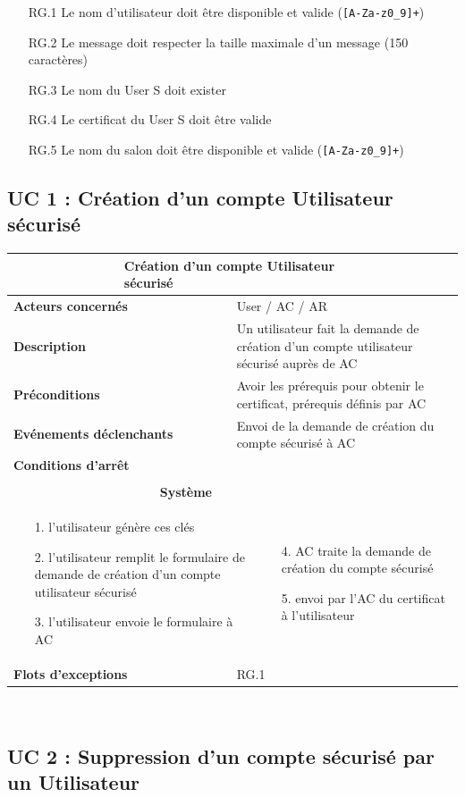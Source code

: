 \documentclass[a4paper,11pt,french]{article}
\newcommand{\fiche}[9] {
	\noindent
\begin{tabular}{|p{3.5cm}| p{1cm} | p{3cm} | p{.5cm} | p{7cm}|} 
\hline
\rowcolor{blue}
\multicolumn{2}{|l|}{\color{white}\bfseries{Nom}} & \multicolumn{3}{l|}{\color{white}\bfseries{#1}}\\
\hline
\multicolumn{2}{|l|}{\bfseries{Acteurs concernés}} & \multicolumn{3}{m{10.5cm}|}{#2}\\
\hline
\multicolumn{2}{|l|}{\bfseries{Description}} & \multicolumn{3}{m{10.5cm}|}{#3}\\
\hline
\multicolumn{2}{|l|}{\bfseries{Préconditions}} & \multicolumn{3}{m{10.5cm}|}{#4}\\
\hline
\multicolumn{2}{|l|}{\bfseries{Evénements déclenchants}} & \multicolumn{3}{m{10.5cm}|}{#5}\\
\hline
\multicolumn{2}{|l|}{\bfseries{Conditions d'arrêt}} & \multicolumn{3}{m{10.5cm}|}{#6}\\
\hline
\rowcolor{gray}
\multicolumn{5}{|c|}{\bfseries{Description du flot d'événements principal}}\\
\hline
\rowcolor{gray}
\multicolumn{3}{|c|}{\bfseries{Acteur(s)}} & \multicolumn{2}{c|}{\bfseries{Système}}\\
\hline
\multicolumn{3}{|p{7.5cm}|}{#7} & \multicolumn{2}{p{7.5cm}|}{#8}\\
\hline
\multicolumn{2}{|l}{\bfseries{Flots d'exceptions}} & \multicolumn{3}{|p{11.5cm}|}{#9}\\
\hline
\end{tabular}
\\
}
\begin{document}
\newpage
\begin{itemize}
\item [RG.1] Le nom d'utilisateur doit être disponible et valide (\verb![A-Za-z0_9]+!)
\item [RG.2] Le message doit respecter la taille maximale d'un message (150 caractères)
\item [RG.3] Le nom du User S doit exister
\item [RG.4] Le certificat du User S doit être valide
\item [RG.5] Le nom du salon doit être disponible et valide (\verb![A-Za-z0_9]+!)
\end{itemize}
\subsection{UC 1 : Création d'un compte Utilisateur sécurisé}

\fiche
	{Création d'un compte Utilisateur sécurisé} %
	{User / AC / AR} %
	{Un utilisateur fait la demande de création d’un compte utilisateur sécurisé auprès de AC} %
	{Avoir les prérequis pour obtenir le certificat, prérequis définis par AC} %
	{Envoi de la demande de création du compte sécurisé à AC} %
	{} %
	{\begin{itemize}  %
		\item [1.] l’utilisateur génère ces clés
		\item [2.] l’utilisateur remplit le formulaire de demande de création d’un compte utilisateur sécurisé 
		\item [3.] l’utilisateur envoie le formulaire à AC  
	 \end{itemize}
	} 
	{\begin{itemize}  %
		\item []
		\item []
		\item [4.] AC traite la demande de création du compte sécurisé
		\item [5.] envoi par l'AC du certificat à l'utilisateur
	\end{itemize}
	 }
	{RG.1} %

\subsection{UC 2 : Suppression d’un compte sécurisé par un Utilisateur}
\end{document}
